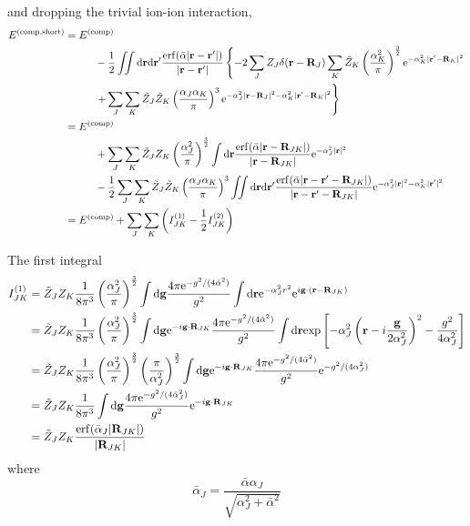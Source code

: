 \documentclass[paper=a4, fontsize=11pt]{article} %
\numberwithin{equation}{section} %
\numberwithin{figure}{section} %
\numberwithin{table}{section} %
\newcommand{\bg}{{\bf{g}}}
\newcommand{\br}{{\bf{r}}}
\newcommand{\bR}{{\bf{R}}}
\newcommand{\rexp}{{\mathrm{exp}}}
\newcommand{\re}{{\mathrm{e}}}
\newcommand{\rshort}{{\mathrm{short}}}
\newcommand{\rerf}{{\mathrm{erf}}}
\newcommand{\rd}{{\mathrm{d}}}
\newcommand{\rcomp}{{\mathrm{comp}}}
\newcommand{\al}{{\alpha}}
\newcommand{\bal}{{\bar{\alpha}}}
\begin{document}
and dropping the trivial ion-ion interaction,
\begin{equation}
\begin{split}
E^{(\rcomp,\rshort)} 
&= E^{(\rcomp)} \\
&\hspace{10mm} - \frac{1}{2}\iint \rd \br \rd \br' \frac{\rerf(\bar {\al}|\br-\br'|)}{|\br-\br'|} \left\{-2 \sum_J Z_J\delta(\br-\bR_J) \sum_K \tilde Z_K\left(\frac{\al_K^2}{\pi}\right)^{\frac{3}{2}}\re^{-\al_K^2|\br'-\bR_K|^2} \right. \\
&\left.\hspace{10mm} + \sum_J\sum_K \tilde Z_J\tilde Z_K\left(\frac{\al_J\al_K}{\pi}\right)^3\re^{-\al_J^2|\br-\bR_J|^2-\al_K^2|\br'-\bR_K|^2}\right\}\\
&= E^{(\rcomp)} \\
&\hspace{10mm} + \sum_J \sum_K  \tilde Z_J Z_K \left(\frac{\al_J^2}{\pi}\right)^{\frac{3}{2}} \int \rd \br  \frac{\rerf(\bar {\al}|\br-\bR_{JK}|)}{|\br-\bR_{JK}|}  \re^{-\al_J^2|\br|^2}  \\
&\hspace{10mm} - \frac{1}{2}\sum_J\sum_K \tilde Z_J\tilde Z_K\left(\frac{\al_J\al_K}{\pi}\right)^3\iint \rd \br \rd \br' \frac{\rerf(\bar {\al}|\br-\br'-\bR_{JK}|)}{|\br-\br'-\bR_{JK}|} \re^{-\al_J^2|\br|^2-\al_K^2|\br'|^2}\\
&= E^{(\rcomp)} + \sum_J \sum_K \left({I_{JK}^{(1)} - \frac{1}{2}I_{JK}^{(2)}}\right)
\end{split}
\end{equation}

The first integral
\begin{equation}
\begin{split}
I_{JK}^{(1)}
&= \tilde Z_J Z_K \frac{1}{8\pi^3} \left(\frac{\al_J^2}{\pi}\right)^{\frac{3}{2}} \int \rd \bg \frac{4\pi \re^{-g^2/(4\bar{\al}^2)}}{g^2}\int \rd \br \re^{-\al_J^2 r^2} \re^{i\bg\cdot (\br-\bR_{JK})}\\
&= \tilde Z_J Z_K \frac{1}{8\pi^3} \left(\frac{\al_J^2}{\pi}\right)^{\frac{3}{2}} \int \rd \bg \re^{-i\bg\cdot\bR_{JK}}\frac{4\pi \re^{-g^2/(4\bar{\al}^2)}}{g^2}\int \rd \br \rexp\left[{-\al_J^2\left(\br- i\frac{\bg}{2\al_J^2}\right)^2 - \frac{g^2}{4\al_J^2}}\right]\\
&= \tilde Z_J Z_K \frac{1}{8\pi^3} \left(\frac{\al_J^2}{\pi}\right)^{\frac{3}{2}} \left(\frac{\pi}{\al_J^2}\right)^{\frac{3}{2}}\int \rd \bg \re^{-i\bg\cdot\bR_{JK}}\frac{4\pi \re^{-g^2/(4\bar{\al}^2)}}{g^2} \re^{-g^2/(4\al_J^2)}\\
&= \tilde Z_J Z_K \frac{1}{8\pi^3}\int \rd \bg \frac{4\pi\re^{-g^2/(4\bal_J^2)}}{g^2}\re^{-i\bg\cdot\bR_{JK}}\\
&= \tilde Z_J Z_K \frac{\rerf(\bal_J |\bR_{JK}|)}{|\bR_{JK}|}
\end{split}
\end{equation}
where
\begin{equation}
\bal_J= \frac{\bal \al_J}{\sqrt{\al_J^2 + \bal^2}}
\end{equation}
\end{document}
